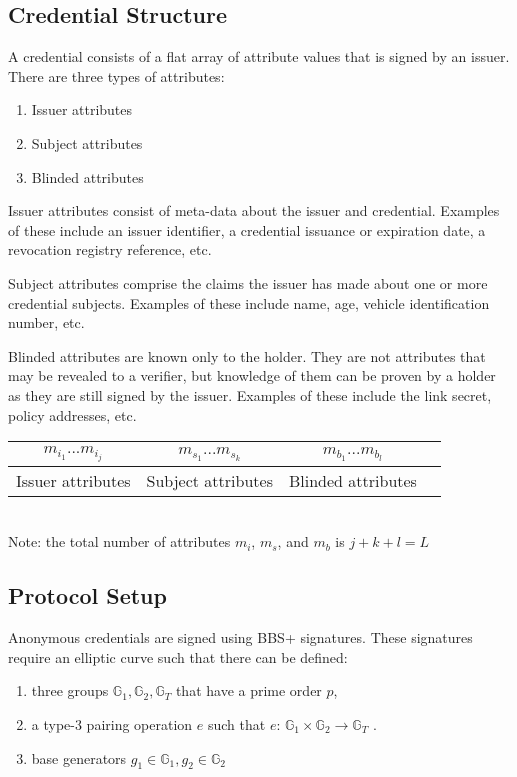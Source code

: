 \documentclass[a4paper]{article}
\begin{document}
\subsection{Credential Structure}
A credential consists of a flat array of attribute values that is signed by an issuer. There are three types of attributes:
\begin{enumerate}
    \item Issuer attributes
    \item Subject attributes
    \item Blinded attributes
\end{enumerate}
Issuer attributes consist of meta-data about the issuer and credential. Examples of these include an issuer identifier, a credential issuance or expiration date, a revocation registry reference, etc.

Subject attributes comprise the claims the issuer has made about one or more credential subjects. Examples of these include name, age, vehicle identification number, etc.

Blinded attributes are known only to the holder. They are not attributes that may be revealed to a verifier, but knowledge of them can be proven by a holder as they are still signed by the issuer. Examples of these include the link secret, policy addresses, etc.


\begin{center}
    \begin{tabular}{|c|c|c|c|}
         \hline
         $m_{i_1} ... m_{i_j}$ & $m_{s_1} ... m_{s_k}$ & $m_{b_1} ... m_{b_l}$ \\
         \hline
         Issuer attributes & Subject attributes & Blinded attributes\\
         \hline 
    \end{tabular}\\
    Note: the total number of attributes $m_i$, $m_s$, and $m_b$ is $j + k + l = L$
\end{center}
\subsection{Protocol Setup}

Anonymous credentials are signed using BBS+ signatures. These signatures require an elliptic curve such that there can be defined:
\begin{enumerate}
    \item three groups $\mathbb{G}_1, \mathbb{G}_2, \mathbb{G}_T$ that have a prime order $p$, 
    \item a type-3 pairing operation $e$ such that $e:\, \mathbb{G}_1 \times \mathbb{G}_2 \rightarrow \mathbb{G}_T$ \cite{GPS08}.
    \item base generators $g_1 \in \mathbb{G}_1, g_2 \in \mathbb{G}_2$
\end{enumerate}
\end{document}
